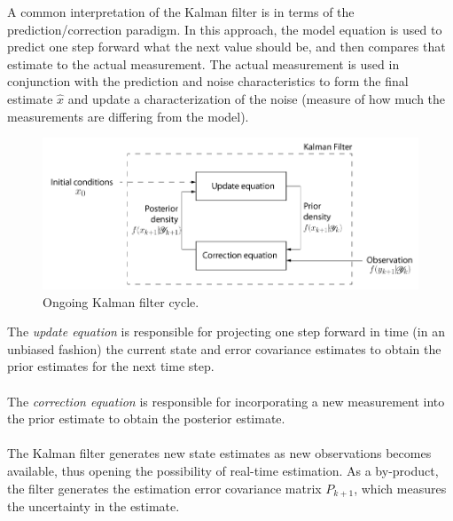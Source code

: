 \documentclass{article}
\theoremstyle{definition}
\theoremstyle{remark}
\newcommand{\filtrationObs}[1]{\ensuremath{\mathscr{Y}_{#1}}}
\begin{document}

A common interpretation of the Kalman filter is in terms of the prediction/correction paradigm. In this approach, the model equation is used to predict one step forward what the next value should be, and then compares that estimate to the actual measurement. The actual measurement is used in conjunction with the prediction and noise characteristics to form the final estimate $\hat{x}$ and update a characterization of the noise (measure of how much the measurements are differing from the model).

\begin{figure}[h!]
	\centering
	\includegraphics[width=.9\textwidth]{kalmanDiag.png}
	\caption{Ongoing Kalman filter cycle.}
\end{figure}



The \emph{update equation} is responsible for projecting one step forward in time (in an unbiased fashion) the current state and error covariance estimates to obtain the prior estimates for the next time step.\\
\\
The \emph{correction equation} is responsible for incorporating a new measurement into the prior estimate to obtain the posterior estimate.\\
\\
The Kalman filter generates new state estimates as new observations becomes available, thus opening the possibility of real-time estimation. As a by-product, the filter generates the estimation error covariance matrix $P_{k+1}$, which measures the uncertainty in the estimate.
\\
\end{document}

